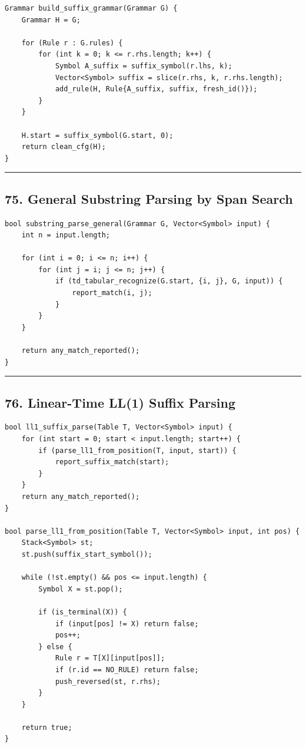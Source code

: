 \documentclass[10pt,letterpaper]{article}
\begin{document}
\begin{verbatim}
Grammar build_suffix_grammar(Grammar G) {
    Grammar H = G;

    for (Rule r : G.rules) {
        for (int k = 0; k <= r.rhs.length; k++) {
            Symbol A_suffix = suffix_symbol(r.lhs, k);
            Vector<Symbol> suffix = slice(r.rhs, k, r.rhs.length);
            add_rule(H, Rule{A_suffix, suffix, fresh_id()});
        }
    }

    H.start = suffix_symbol(G.start, 0);
    return clean_cfg(H);
}
\end{verbatim}

\medskip\hrule\medskip

\subsection*{75. General Substring Parsing by Span Search}

\begin{verbatim}
bool substring_parse_general(Grammar G, Vector<Symbol> input) {
    int n = input.length;

    for (int i = 0; i <= n; i++) {
        for (int j = i; j <= n; j++) {
            if (td_tabular_recognize(G.start, {i, j}, G, input)) {
                report_match(i, j);
            }
        }
    }

    return any_match_reported();
}
\end{verbatim}

\medskip\hrule\medskip

\subsection*{76. Linear-Time LL(1) Suffix Parsing}

\begin{verbatim}
bool ll1_suffix_parse(Table T, Vector<Symbol> input) {
    for (int start = 0; start < input.length; start++) {
        if (parse_ll1_from_position(T, input, start)) {
            report_suffix_match(start);
        }
    }
    return any_match_reported();
}

bool parse_ll1_from_position(Table T, Vector<Symbol> input, int pos) {
    Stack<Symbol> st;
    st.push(suffix_start_symbol());

    while (!st.empty() && pos <= input.length) {
        Symbol X = st.pop();

        if (is_terminal(X)) {
            if (input[pos] != X) return false;
            pos++;
        } else {
            Rule r = T[X][input[pos]];
            if (r.id == NO_RULE) return false;
            push_reversed(st, r.rhs);
        }
    }

    return true;
}
\end{verbatim}
\end{document}
